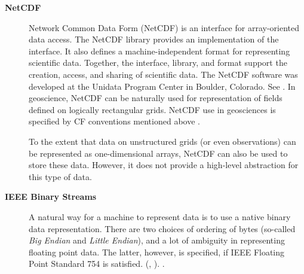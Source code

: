 \begin{description}
\item[\bf NetCDF] Network Common Data Form (NetCDF) is an interface for 
array-oriented data access. The NetCDF library provides an
implementation of the interface. It also defines a 
machine-independent format for representing scientific data. Together,
the interface, library, and format support the creation, access, and
sharing of scientific data. The NetCDF software was developed at the
Unidata Program Center in Boulder, Colorado. See \cite{NetCDF3_UsersGuide_C}.
In geoscience, NetCDF can be naturally used for representation of fields 
defined on logically rectangular grids. NetCDF use in geosciences is 
specified by CF conventions mentioned above \cite{NetCDF_CF_v1_beta3}. 

To the extent that data on unstructured grids (or even observations) can be 
represented as one-dimensional arrays, NetCDF can also be used to store these 
data. However, it does not provide a high-level abstraction for this type of 
data. 

\item[\bf IEEE Binary Streams]
A natural way for a machine to represent data is to use a native
binary data representation. There are two choices of ordering of bytes
(so-called {\it Big Endian} and {\it Little Endian}), and a lot of
ambiguity in representing floating point data. The latter, however, is
specified, if IEEE Floating Point Standard 754 is satisfied.
(\cite{IEEE-Floating-Point}, \cite{Kahan-IEEE-754}). 
\cite{XML-W3C}.

\end{description}

